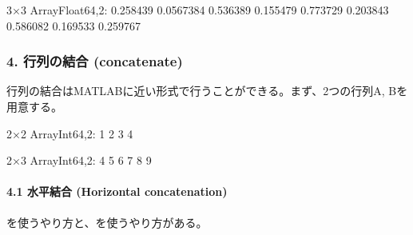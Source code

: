 \documentclass[letterpaper,10pt,english]{sphinxmanual}
\begin{document}
\begin{sphinxVerbatim}[commandchars=\\\{\}]
3×3 Array\PYGZob{}Float64,2\PYGZcb{}:
 0.258439  0.0567384  0.536389
 0.155479  0.773729   0.203843
 0.586082  0.169533   0.259767
\end{sphinxVerbatim}

\begin{sphinxVerbatim}[commandchars=\\\{\}]
 
\end{sphinxVerbatim}

\begin{sphinxVerbatim}[commandchars=\\\{\}]
[1.0 1.0 1.0]
\end{sphinxVerbatim}


\subsubsection{4. 行列の結合 (concatenate)}
\label{\detokenize{tips:concatenate}}
行列の結合はMATLABに近い形式で行うことができる。まず、2つの行列A, Bを用意する。

\begin{sphinxVerbatim}[commandchars=\\\{\}]
  \PYG{p}{[}   \PYG{p}{]}
\end{sphinxVerbatim}

\begin{sphinxVerbatim}[commandchars=\\\{\}]
2×2 Array\PYGZob{}Int64,2\PYGZcb{}:
 1  2
 3  4
\end{sphinxVerbatim}

\begin{sphinxVerbatim}[commandchars=\\\{\}]
  \PYG{p}{[}     \PYG{p}{]}
\end{sphinxVerbatim}

\begin{sphinxVerbatim}[commandchars=\\\{\}]
2×3 Array\PYGZob{}Int64,2\PYGZcb{}:
 4  5  6
 7  8  9
\end{sphinxVerbatim}


\paragraph{4.1 水平結合 (Horizontal concatenation)}
\label{\detokenize{tips:horizontal-concatenation}}
を使うやり方と、\sphinxcode{\sphinxupquote{{[} {]}}}を使うやり方がある。
\end{document}
